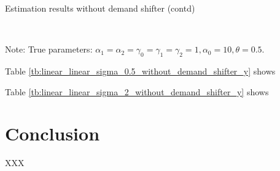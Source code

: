 \documentclass[11pt, a4paper]{article}
\begin{document}
\begin{table}[!htbp]
  \begin{center}
      \caption{Estimation results  without demand shifter (contd)}
      \label{tb:linear_linear_sigma_2_without_demand_shifter_y} 
      \subfloat[$\sigma=1.0$]{}\\
      \subfloat[$\sigma=2.0$]{}
  \end{center}\footnotesize
  Note: True parameters: $\alpha_1 = \alpha_2 =  \gamma_0 = \gamma_1 = \gamma_2  = 1, \alpha_0 = 10, \theta = 0.5.$
\end{table} 


Table \ref{tb:linear_linear_sigma_0.5_without_demand_shifter_y} shows

Table \ref{tb:linear_linear_sigma_2_without_demand_shifter_y} shows


\section{Conclusion}

XXX

\newpage
\end{document}

